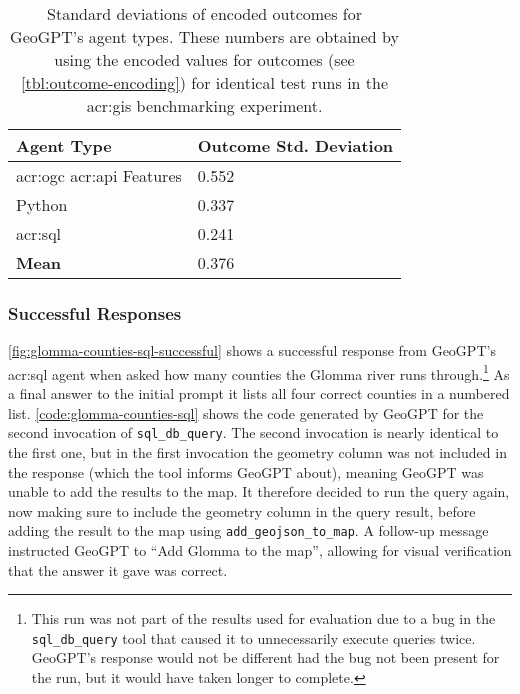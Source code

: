 \begin{table}[htbp]
    \centering
    \caption[Standard deviations of encoded outcomes for GeoGPT's agent types]{Standard deviations of encoded outcomes for GeoGPT's agent types. These numbers are obtained by using the encoded values for outcomes (see \autoref{tbl:outcome-encoding}) for identical test runs in the \acrshort{acr:gis} benchmarking experiment.}
    \label{tbl:stddev-by-agent-type}
    \begin{tabularx}{0.7\textwidth}{XX}
        \toprule
        \textbf{Agent Type}                            & \textbf{Outcome Std. Deviation} \\
        \midrule
        \acrshort{acr:ogc} \acrshort{acr:api} Features & 0.552                           \\
        Python                                         & 0.337                           \\
        \acrshort{acr:sql}                             & 0.241                           \\
        \midrule
        \textbf{Mean}                                  & 0.376                           \\
        \bottomrule
    \end{tabularx}
\end{table}

\subsubsection{Successful Responses}

\autoref{fig:glomma-counties-sql-successful} shows a successful response from GeoGPT's \acrshort{acr:sql} agent when asked how many counties the Glomma river runs through.\footnote{This run was not part of the results used for evaluation due to a bug in the \texttt{sql\_db\_query} tool that caused it to unnecessarily execute queries twice. GeoGPT's response would not be different had the bug not been present for the run, but it would have taken longer to complete.} As a final answer to the initial prompt it lists all four correct counties in a numbered list. \autoref{code:glomma-counties-sql} shows the code generated by GeoGPT for the second invocation of \texttt{sql\_db\_query}. The second invocation is nearly identical to the first one, but in the first invocation the geometry column was not included in the response (which the tool informs GeoGPT about), meaning GeoGPT was unable to add the results to the map. It therefore decided to run the query again, now making sure to include the geometry column in the query result, before adding the result to the map using \texttt{add\_geojson\_to\_map}. A follow-up message instructed GeoGPT to \enquote{Add Glomma to the map}, allowing for visual verification that the answer it gave was correct.

